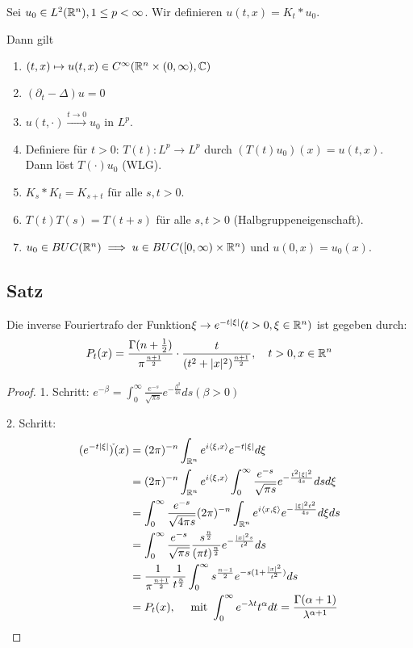 Sei $u_0 \in L^2(\mathbb{R}^n), 1 \leq p < \infty$. 
Wir definieren $u(t,x) = K_t \ast u_0$.

Dann gilt
\begin{enumerate}
  \item $(t,x)  \mapsto u(t,x) \in C^\infty(\mathbb{R}^n \times (0,\infty), \mathbb{C})$
  \item $(\partial_t - \Delta) u = 0$
  \item $u(t, \cdot) \overset{t \to 0}{\to} u_0$ in $L^p$.
  \item Definiere für $t > 0$: $T(t) \colon L^p \to L^p$ durch $(T(t)u_0)(x) = u(t,x)$.
    Dann löst $T(\cdot)u_0$ (WLG).
  \item $K_s \ast K_t = K_{s + t}$ für alle $s,t > 0$.
  \item $T(t)T(s) = T(t + s)$ für alle $s, t >0$ (Halbgruppeneigenschaft).
  \item $u_0 \in BUC(\mathbb{R}^n) \implies u \in BUC([0,\infty) \times \mathbb{R}^n)$ und $u(0,x) = u_0(x)$.
\end{enumerate}

\subsection{Satz}

Die inverse Fouriertrafo der Funktion$\xi \to e^{-t|\xi|} ( t > 0, \xi \in \mathbb{R}^n)$ ist gegeben durch:
$$
P_t(x) = \frac{\Gamma(n + \frac{1}{2})}{\pi^{\frac{n+1}{2}}} \cdot \frac{t}{(t^2 + |x|^2)^{\frac{n + 1}{2}}},\quad t > 0, x \in \mathbb{R}^n
$$

\begin{proof}
  1. Schritt: $e^{-\beta} = \int_0^\infty \frac{e^{-s}}{\sqrt{\pi s }} e^{- \frac{\beta^2}{4s}} ds (\beta > 0)$

  2. Schritt: 
  \begin{align*}
    (e^{-t|\xi|})^{\check{}}(x) 
    &= (2\pi)^{-n} \int_{\mathbb{R}^n} e^{i \langle \xi, x \rangle} e^{-t|\xi|} d \xi \\
    &= (2 \pi)^{-n} \int_{\mathbb{R}^n} e^{i \langle \xi, x\rangle} \int_0^\infty \frac{e^{-s}}{\sqrt{\pi s}} e^{-\frac{t^2|\xi|^2}{4s}} ds d\xi \\
    &= \int_0^\infty \frac{e^{-s}}{\sqrt{4\pi s}}(2\pi)^{-n} \int_{\mathbb{R}^n} e^{i \langle x, \xi \rangle} e^{- \frac{|\xi|^2 t^2}{4s}} d\xi ds\\
    &= \int_0^\infty \frac{e^{-s}}{\sqrt{\pi s}} \frac{s^{\frac{n}{2}}}{(\pi t)^{\frac{n}{2}}} e^{-\frac{|x|^2 s}{t^2}} ds \\
    &= \frac{1}{\pi^{\frac{n+1}{2}}} \frac{1}{t^{\frac{n}{2}}} \int_0^\infty s^{\frac{n-1}{2}} e^{-s(1 + \frac{|x|^2}{t^2})} ds \\
    &= P_t(x),  \quad \text{ mit } \int_0^\infty e^{-\lambda t} t^\alpha dt = \frac{\Gamma(\alpha + 1)}{\lambda^{\alpha + 1}}
  \end{align*}
\end{proof}

